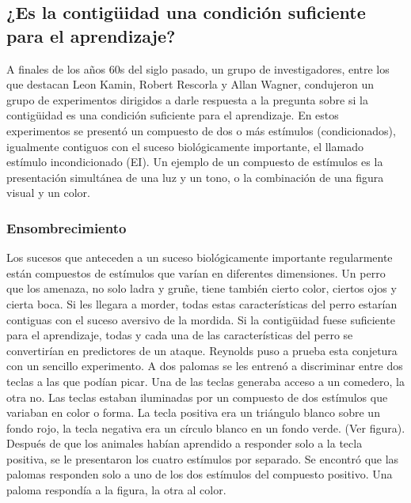 \documentclass[
  a4paper,
  DIV=11,
  numbers=noendperiod]{scrreprt}
\begin{document}
\subsection{¿Es la contigüidad una condición suficiente para el
aprendizaje?}\label{es-la-contiguxfcidad-una-condiciuxf3n-suficiente-para-el-aprendizaje}

A finales de los años 60s del siglo pasado, un grupo de investigadores,
entre los que destacan Leon Kamin, Robert Rescorla y Allan Wagner,
condujeron un grupo de experimentos dirigidos a darle respuesta a la
pregunta sobre si la contigüidad es una condición suficiente para el
aprendizaje. En estos experimentos se presentó un compuesto de dos o más
estímulos (condicionados), igualmente contiguos con el suceso
biológicamente importante, el llamado estímulo incondicionado (EI). Un
ejemplo de un compuesto de estímulos es la presentación simultánea de
una luz y un tono, o la combinación de una figura visual y un color.

\subsubsection{Ensombrecimiento}\label{ensombrecimiento}

Los sucesos que anteceden a un suceso biológicamente importante
regularmente están compuestos de estímulos que varían en diferentes
dimensiones. Un perro que los amenaza, no solo ladra y gruñe, tiene
también cierto color, ciertos ojos y cierta boca. Si les llegara a
morder, todas estas características del perro estarían contiguas con el
suceso aversivo de la mordida. Si la contigüidad fuese suficiente para
el aprendizaje, todas y cada una de las características del perro se
convertirían en predictores de un ataque. Reynolds puso a prueba esta
conjetura con un sencillo experimento. A dos palomas se les entrenó a
discriminar entre dos teclas a las que podían picar. Una de las teclas
generaba acceso a un comedero, la otra no. Las teclas estaban iluminadas
por un compuesto de dos estímulos que variaban en color o forma. La
tecla positiva era un triángulo blanco sobre un fondo rojo, la tecla
negativa era un círculo blanco en un fondo verde. (Ver figura). Después
de que los animales habían aprendido a responder solo a la tecla
positiva, se le presentaron los cuatro estímulos por separado. Se
encontró que las palomas responden solo a uno de los dos estímulos del
compuesto positivo. Una paloma respondía a la figura, la otra al color.
\end{document}
